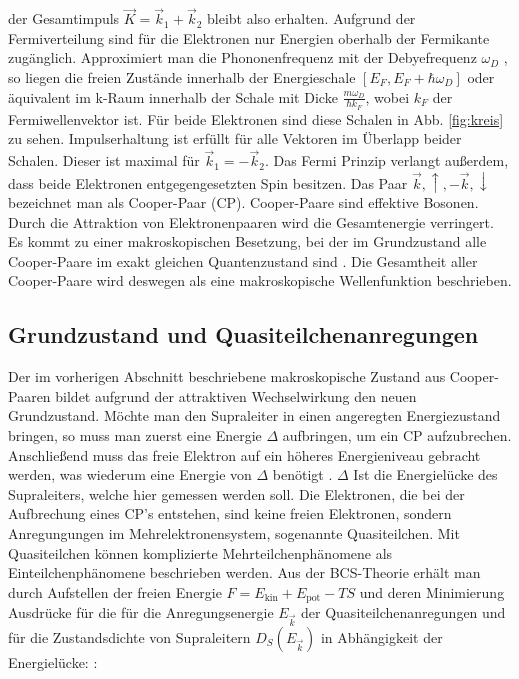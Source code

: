 \documentclass[twoside,        %
               BCOR12mm,       %
               english,ngerman, %
               fleqn,headsepline=false,footsepline=false
              ]{Vorlage/MFPREPORT}
\begin{document}
der Gesamtimpuls $\vec K=\vec k_1 + \vec k_2$ bleibt also erhalten.
Aufgrund der Fermiverteilung sind für die Elektronen nur Energien oberhalb der
Fermikante zugänglich. Approximiert man die Phononenfrequenz mit der
Debyefrequenz $\omega_D$ \cite[S\;ff.]{hunklingerfk}, so liegen die freien Zustände innerhalb der
Energieschale $[E_F,E_F+\hbar \omega_D]$ oder äquivalent im k-Raum innerhalb
der Schale mit Dicke $\frac{m\omega_D}{\hbar k_F}$, wobei $k_F$ der
Fermiwellenvektor ist. Für beide Elektronen sind diese Schalen in Abb.
\ref{fig:kreis} zu sehen. Impulserhaltung ist erfüllt für alle Vektoren im
Überlapp beider Schalen. Dieser ist maximal für $\vec k_1 = -\vec k_2$. Das
Fermi Prinzip verlangt außerdem, dass beide Elektronen entgegengesetzten Spin
besitzen. Das Paar ${\vec k,\uparrow},{-\vec k,\downarrow}$ bezeichnet man als
Cooper-Paar (CP). Cooper-Paare sind effektive Bosonen. Durch die Attraktion von
Elektronenpaaren wird die Gesamtenergie verringert. Es kommt zu einer
makroskopischen Besetzung, bei der im Grundzustand alle Cooper-Paare im exakt gleichen
Quantenzustand sind \cite[Kap. 2.2]{buckel2013supraleitung}. Die Gesamtheit
aller Cooper-Paare wird deswegen als eine makroskopische Wellenfunktion
beschrieben.
\subsection{Grundzustand und Quasiteilchenanregungen}
Der im vorherigen Abschnitt beschriebene makroskopische Zustand aus
Cooper-Paaren bildet aufgrund der attraktiven Wechselwirkung den neuen
Grundzustand. Möchte man den Supraleiter in einen angeregten Energiezustand
bringen, so muss man zuerst eine Energie $\Delta$ aufbringen, um ein CP
aufzubrechen. Anschließend muss das freie Elektron auf ein höheres
Energieniveau gebracht werden, was wiederum eine Energie von $\Delta$ benötigt
\cite{tidecks1990current}. $\Delta$ Ist die Energielücke des Supraleiters,
welche hier gemessen werden soll. Die Elektronen, die bei der Aufbrechung eines CP's
entstehen, sind keine freien Elektronen, sondern Anregungungen im
Mehrelektronensystem, sogenannte Quasiteilchen. Mit Quasiteilchen können
komplizierte Mehrteilchenphänomene als Einteilchenphänomene beschrieben werden.
Aus der BCS-Theorie erhält man durch Aufstellen der freien Energie
$F=E_\text{kin}+E_\text{pot}-TS$ und deren Minimierung Ausdrücke für die
für die Anregungsenergie $E_{\vec{k}}$ der Quasiteilchenanregungen und für die
Zustandsdichte von Supraleitern $D_S(E_{\vec{k}})$ in Abhängigkeit der Energielücke: \cite[Kap.]{enss2011tieftemperaturphysik}:
\end{document}
